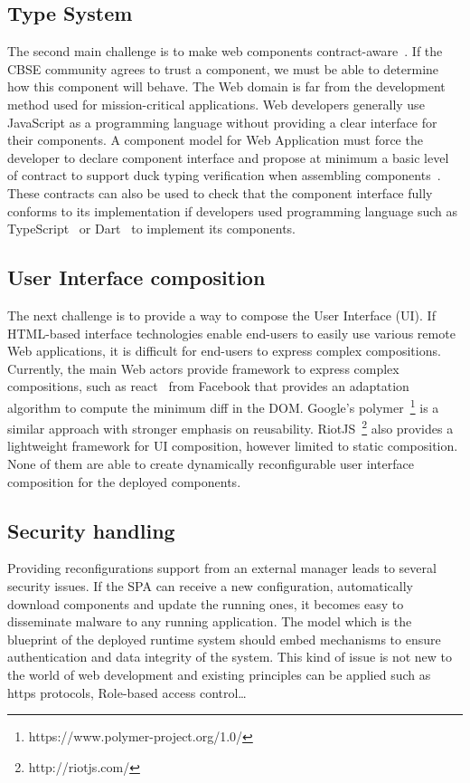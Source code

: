 \subsection{Type System}

The second main challenge is to make web components contract-aware~\cite{beugnard1999making}. If the CBSE community agrees to trust a component, we must be able to determine how this component will behave. The Web domain is far from the development method used for  mission-critical applications. Web developers generally use JavaScript as a programming language without providing a clear interface for their components. A component model for Web Application must force the developer to declare component interface and propose at minimum a basic level of contract to support duck typing verification when assembling components~\cite{beugnard1999making}. These contracts can also be used to check that the component interface fully conforms to its implementation if developers used  programming language such as TypeScript~\cite{rastogi2015safe} or Dart~\cite{dhiman2012google} to implement its components.

\subsection{User Interface composition}  
The next challenge is to provide a way to compose the User Interface (UI). If HTML-based interface technologies enable end-users to easily use various remote Web applications, it is difficult for end-users to express complex compositions. Currently, the main Web actors provide framework to express complex compositions, such as react~\cite{fedosejev2015react} from Facebook that provides an adaptation algorithm to compute the minimum diff in the DOM. Google's polymer~\footnote{https://www.polymer-project.org/1.0/} is a similar approach with stronger emphasis on reusability. RiotJS~\footnote{http://riotjs.com/} also provides a lightweight framework for UI composition, however limited to static composition. None of them are able to create dynamically reconfigurable user interface composition for the deployed components.

\subsection{Security handling}
Providing reconfigurations support from an external manager leads to several security issues. If the SPA can receive a new configuration, automatically download components and update the running ones, it becomes easy to disseminate malware to any running application. The model which is the blueprint of the deployed runtime system should embed mechanisms to ensure authentication and data integrity of the system. This kind of issue is not new to the world of web development and existing principles can be applied such as https protocols, Role-based access control\dots

